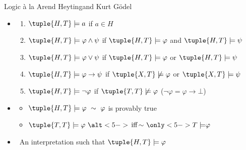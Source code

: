 \begin{frame}{Logic \`a la Arend Heyting}{and Kurt G\"odel}
  \smallskip
  \begin{itemize}
  \item {}
    \begin{enumerate}
    \item $\tuple{H,T} \models a$ if $a \in H$
    \item $\tuple{H,T} \models \varphi \wedge \psi$ if
      $\tuple{H,T} \models \varphi$
      and
      $\tuple{H,T} \models \psi$
    \item $\tuple{H,T} \models \varphi \vee \psi$ if
      $\tuple{H,T} \models \varphi$
      or
      $\tuple{H,T} \models \psi$
      \smallskip
    \item<2-> \alert<2-3>{$\tuple{H,T} \models \varphi \rightarrow \psi$ if
        $\tuple{X,T} \not\models \varphi$ or $\tuple{X,T} \models \psi$
        }
      \smallskip
    \item<only@3> $\tuple{H,T} \models \neg\varphi$ if $\tuple{T,T} \not\models \varphi$
      \hfill ($\neg\varphi = \varphi\to\bot$)
    \end{enumerate}
  \item<4-> 
    \begin{itemize}
    \item $\tuple{H,T}\models\varphi\ \sim\ \varphi$ is provably true
    \item $\tuple{T,T}\models\varphi\ \alt<5->{\text{\,iff\,}}{\sim}\ \only<5->{T\models}\varphi$
    \end{itemize}
    \smallskip
  \item<6->  \ An interpretation  such that $\tuple{H,T} \models \varphi$
  \end{itemize}
  \medskip
\end{frame}
%
